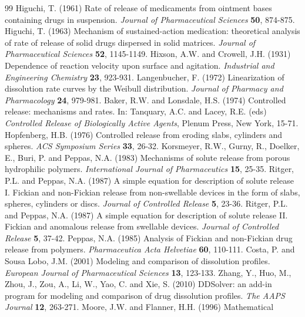 \documentclass[11pt,a4paper]{article}
\begin{document}
\begin{thebibliography}{99}
\small
{} Higuchi, T. (1961) Rate of release of medicaments from
ointment bases containing drugs in suspension. \emph{Journal of Pharmaceutical
Sciences} \textbf{50}, 874-875.
 Higuchi, T. (1963) Mechanism of sustained-action
medication: theoretical analysis of rate of release of solid drugs dispersed in
solid matrices. \emph{Journal of Pharmaceutical Sciences} \textbf{52},
1145-1149.
 Hixson, A.W. and Crowell, J.H. (1931) Dependence of
reaction velocity upon surface and agitation. \emph{Industrial and Engineering
Chemistry} \textbf{23}, 923-931.
 Langenbucher, F. (1972) Linearization of dissolution
rate curves by the Weibull distribution. \emph{Journal of Pharmacy and
Pharmacology} \textbf{24}, 979-981.
 Baker, R.W. and Lonsdale, H.S. (1974) Controlled release:
mechanisms and rates. In: Tanquary, A.C. and Lacey, R.E. (eds)
\emph{Controlled Release of Biologically Active Agents}, Plenum Press,
New York, 15-71.
 Hopfenberg, H.B. (1976) Controlled release from
eroding slabs, cylinders and spheres. \emph{ACS Symposium Series} \textbf{33},
26-32.
 Korsmeyer, R.W., Gurny, R., Doelker, E., Buri, P. and
Peppas, N.A. (1983) Mechanisms of solute release from porous hydrophilic
polymers. \emph{International Journal of Pharmaceutics} \textbf{15}, 25-35.
 Ritger, P.L. and Peppas, N.A. (1987) A simple equation
for description of solute release I. Fickian and non-Fickian release from
non-swellable devices in the form of slabs, spheres, cylinders or discs.
\emph{Journal of Controlled Release} \textbf{5}, 23-36.
 Ritger, P.L. and Peppas, N.A. (1987) A simple equation
for description of solute release II. Fickian and anomalous release from
swellable devices. \emph{Journal of Controlled Release} \textbf{5}, 37-42.
 Peppas, N.A. (1985) Analysis of Fickian and non-Fickian
drug release from polymers. \emph{Pharmaceutica Acta Helvetiae} \textbf{60},
110-111.
 Costa, P. and Sousa Lobo, J.M. (2001) Modeling and
comparison of dissolution profiles. \emph{European Journal of Pharmaceutical
Sciences} \textbf{13}, 123-133.
 Zhang, Y., Huo, M., Zhou, J., Zou, A., Li, W., Yao, C. and
Xie, S. (2010) DDSolver: an add-in program for modeling and comparison of drug
dissolution profiles. \emph{The AAPS Journal} \textbf{12}, 263-271.
 Moore, J.W. and Flanner, H.H. (1996) Mathematical

\end{thebibliography}
\end{document}

